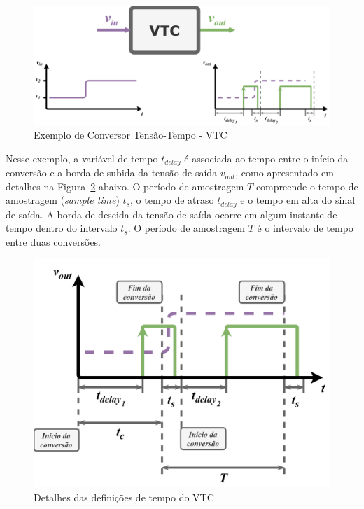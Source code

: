 \documentclass[
	12pt,				%
	openright,			%
	twoside,			%
	a4paper,			%
	english,			%
	french,				%
	spanish,			%
	brazil,				%
	]{abntex2}
\begin{document}
		\begin{figure}[!ht]
			\centering
			\includegraphics[width=\linewidth*3/4]{images/VTC.png}
			\caption{Exemplo de Conversor Tensão-Tempo - VTC}
			\label{fig:VTC}
		\end{figure}
		
		Nesse exemplo, a variável de tempo $t_{delay}$ é associada ao tempo entre o início da conversão e a borda de subida da tensão de saída $v_{out}$, como apresentado em detalhes na Figura~\ref{fig:time_details} abaixo. O período de amostragem $T$ compreende o tempo de amostragem (\textit{sample time}) $t_s$, o tempo de atraso $t_{delay}$ e o tempo em alta do sinal de saída. A borda de descida da tensão de saída ocorre em algum instante de tempo dentro do intervalo $t_s$. O período de amostragem $T$ é o intervalo de tempo entre duas conversões.

		\begin{figure}[h]
			\centering
			\includegraphics[width=\linewidth/2]{images/time_details.png}
			\caption{Detalhes das definições de tempo do VTC}
			\label{fig:time_details}
		\end{figure}
\end{document}
